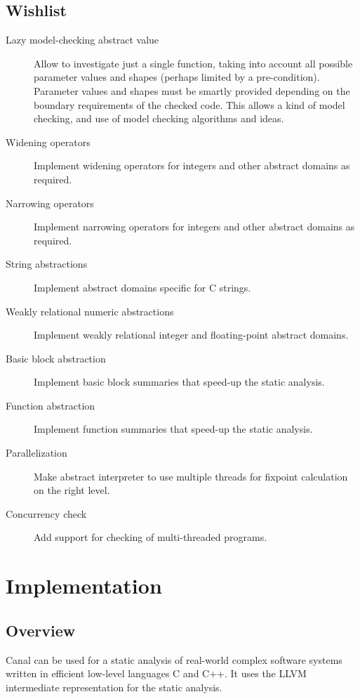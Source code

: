 \documentclass[a4paper]{book}
\begin{document}
\chapter{Wishlist}
\begin{description}
\item[Lazy model-checking abstract value] Allow to investigate just a
  single function, taking into account all possible parameter values
  and shapes (perhaps limited by a pre-condition).  Parameter values
  and shapes must be smartly provided depending on the boundary
  requirements of the checked code.  This allows a kind of model
  checking, and use of model checking algorithms and ideas.
\item[Widening operators] Implement widening operators for integers
  and other abstract domains as required.
\item[Narrowing operators] Implement narrowing operators for integers
  and other abstract domains as required.
\item[String abstractions] Implement abstract domains specific for C
  strings.
\item[Weakly relational numeric abstractions] Implement weakly
  relational integer and floating-point abstract domains.
\item[Basic block abstraction] Implement basic block summaries that
  speed-up the static analysis.
\item[Function abstraction] Implement function summaries that speed-up
  the static analysis.
\item[Parallelization] Make abstract interpreter to use multiple
  threads for fixpoint calculation on the right level.
\item[Concurrency check] Add support for checking of multi-threaded
  programs.
\end{description}

\part{Implementation}

\chapter{Overview}

Canal can be used for a static analysis of real-world complex software
systems written in efficient low-level languages C and C++.  It uses
the LLVM intermediate representation for the static analysis.
\end{document}

